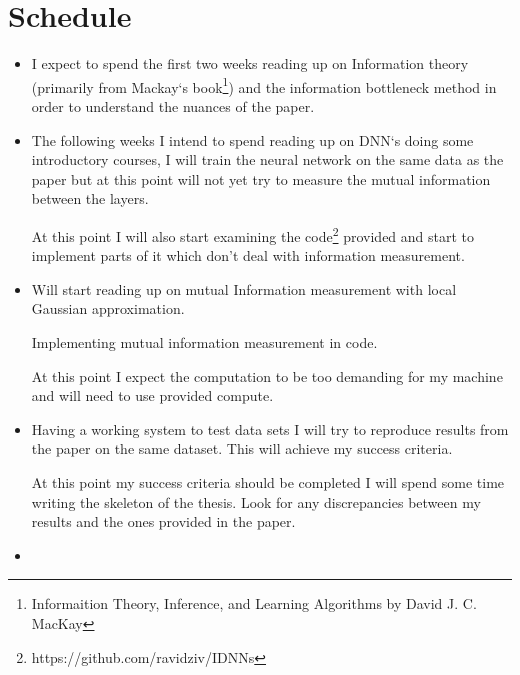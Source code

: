 \documentclass[12pt]{article}
\begin{document}
\newpage

\section*{Schedule}




\begin{itemize}
  \item {

      I expect to spend the first two weeks reading up on Information theory
      (primarily from Mackay`s book\footnote{Informaition Theory, Inference, and
      Learning Algorithms by David J. C. MacKay}) and the information bottleneck
      method in order to understand the nuances of the paper.
  }
  \item {
      
      The following weeks I intend to spend reading up on DNN`s doing some
      introductory courses, I will train the neural network on the same data as
      the paper but at this point will not yet try to measure the mutual
      information between the layers.

      At this point I will also start examining the
      code\footnote{https://github.com/ravidziv/IDNNs} provided and start to
      implement parts of it which don't deal with information measurement.
  }
  \item {

      Will start reading up on mutual Information measurement with local
      Gaussian approximation.

      Implementing mutual information measurement in code.

      At this point I expect the computation to be too demanding for my machine
      and will need to use provided compute.
  } 
  \item {

      Having a working system to test data sets I will try to reproduce results
      from the paper on the same dataset. This will achieve my success criteria.

      At this point my success criteria should be completed I will spend some
      time writing the skeleton of the thesis. Look for any discrepancies
      between my results and the ones provided in the paper.
  } \item {

}
\end{itemize}
\end{document}
